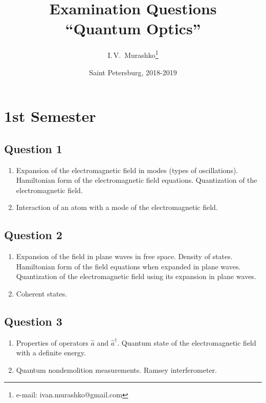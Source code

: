 \documentclass[12pt,a4paper]{article}
\begin{document}
\Russian

\title{Examination Questions \\ ``Quantum Optics''}
\author{I.\,V.~Murashko\thanks{e-mail: ivan.murashko@gmail.com}}
\date{Saint Petersburg, 2018-2019}
\maketitle
\newpage


\section*{1st Semester}

\subsection*{Question 1} 
\begin{enumerate}
\item Expansion of the electromagnetic field in modes (types of oscillations).
Hamiltonian form of the electromagnetic field equations. Quantization of the
electromagnetic field.
\item Interaction of an atom with a mode of the electromagnetic field.
\end{enumerate}

\subsection*{Question 2} 
\begin{enumerate}
\item Expansion of the field in plane waves in free space.
Density of states. Hamiltonian form of the field equations when expanded in plane
waves. Quantization of the electromagnetic field using its expansion in
plane waves.
\item Coherent states.
\end{enumerate}

\subsection*{Question 3} 
\begin{enumerate}
\item Properties of operators $ \hat a $ and $ \hat a ^\dag $. Quantum
state of the electromagnetic field with a definite energy.
\item Quantum nondemolition measurements. Ramsey interferometer.
\end{enumerate}
\end{document}
